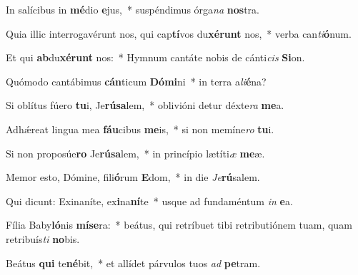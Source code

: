\item In salícibus in \textbf{mé}dio \textbf{e}jus,~* suspéndimus órga\textit{na} \textbf{nos}tra.
\item Quia illic interrogavérunt nos, qui cap\textbf{tí}vos du\textbf{xé}\textbf{runt} nos,~* verba can\textit{ti}\textbf{ó}num.
\item Et qui \textbf{ab}du\textbf{xé}\textbf{runt} nos:~* Hymnum cantáte nobis de cánti\textit{cis} \textbf{Si}on.
\item Quómodo cantábimus \textbf{cán}ticum \textbf{Dó}\textbf{mi}ni~* in terra a\textit{li}\textbf{é}na?
\item Si oblítus fúero \textbf{tu}i, Je\textbf{rú}\textbf{sa}lem,~* oblivióni detur déxte\textit{ra} \textbf{me}a.
\item Adhǽreat lingua mea \textbf{fáu}cibus \textbf{me}is,~* si non memíne\textit{ro} \textbf{tu}i.
\item Si non proposúe\textbf{ro} Je\textbf{rú}\textbf{sa}lem,~* in princípio lætíti\textit{æ} \textbf{me}æ.
\item Memor esto, Dómine, fili\textbf{ó}rum \textbf{E}dom,~* in die \textit{Je}\textbf{rú}salem.
\item Qui dicunt: Exinaníte, ex\textbf{i}na\textbf{ní}te~* usque ad fundaméntum \textit{in} \textbf{e}a.
\item Fília Baby\textbf{ló}nis \textbf{mí}\textbf{se}ra:~* beátus, qui retríbuet tibi retributiónem tuam, quam retribuís\textit{ti} \textbf{no}bis.
\item Beátus \textbf{qui} te\textbf{né}bit,~* et allídet párvulos tuos \textit{ad} \textbf{pe}tram.
